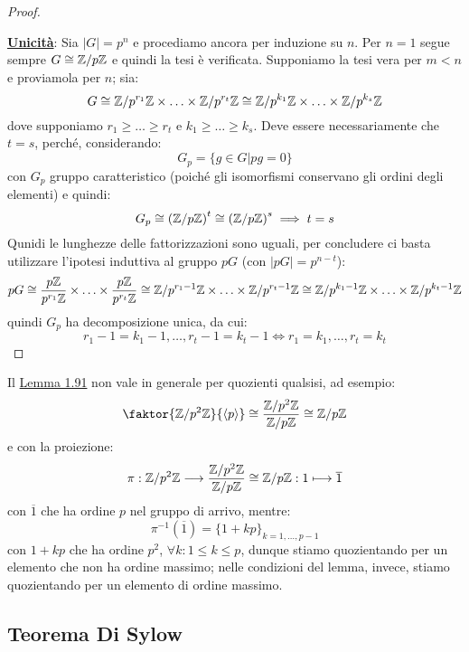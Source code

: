 \documentclass[11pt]{scrartcl}
\begin{document}
\begin{proof}
\begin{itemize}
    \end{itemize}
\underline{\textbf{Unicità}}: Sia $|G| = p^n$ e procediamo ancora per induzione su $n$. Per $n = 1$ segue sempre $G \cong {\mathbb Z}/p{\mathbb Z}$ e quindi la tesi è verificata. Supponiamo la tesi vera per $m<n$ e proviamola per $n$; sia:
        \[ G \cong \mathbb{Z}/{p^{r_1}}\mathbb{Z} \times \ldots \times \mathbb{Z}/{p^{r_t}}\mathbb{Z} \cong \mathbb{Z}/{p^{k_1}}\mathbb{Z} \times \ldots \times \mathbb{Z}/{p^{k_s}}\mathbb{Z}
            \]
        dove supponiamo $r_1 \geq \ldots \geq r_t$ e $k_1 \geq \ldots \geq k_s$. Deve essere necessariamente che $t = s$, perché, considerando:
            \[ G_p = \{g \in G | pg = 0\}
                \]
        con $G_p$ gruppo caratteristico (poiché gli isomorfismi conservano gli ordini degli elementi) e quindi:
            \[ G_p \cong \left({\mathbb Z}/p{\mathbb Z}\right)^t \cong \left({\mathbb Z}/p{\mathbb Z}\right)^s \implies t = s
                \]
        Qunidi le lunghezze delle fattorizzazioni sono uguali, per concludere ci basta utilizzare l'ipotesi induttiva al gruppo $pG$ (con $|pG| = p^{n-t}$):
            \[ pG \cong \frac{p\mathbb Z}{p^{r_1}\mathbb Z} \times \ldots \times \frac{p\mathbb Z}{p^{r_t}\mathbb Z} \cong \mathbb{Z}/{p^{r_1-1}}\mathbb{Z} \times \ldots \times \mathbb{Z}/{p^{r_t-1}}\mathbb{Z} \cong \mathbb{Z}/{p^{k_1-1}}\mathbb{Z} \times \ldots \times \mathbb{Z}/{p^{k_t-1}}\mathbb{Z}
                \]
        quindi $G_p$ ha decomposizione unica, da cui:
            \[ r_1 - 1 = k_1 -1, \ldots, r_t - 1 = k_t - 1 \iff r_1 = k_1, \ldots , r_t = k_t
                \]
\end{proof}

\begin{remark}
    Il \hyperref[l:1.91]{Lemma 1.91} non vale in generale per quozienti qualsisi, ad esempio:
        \[ \faktor{\Z{p^2}}{\left<p\right>} \cong \frac{\Z{p^2}}{\Zp}\cong \Zp
            \]
    e con la proiezione:
        \[ \pi: \mathbb{Z}/{p^2}\mathbb{Z} \longrightarrow \frac{\mathbb{Z}/{p^2}\mathbb{Z}}{{\mathbb Z}/p{\mathbb Z}} \cong {\mathbb Z}/p{\mathbb Z} : 1 \longmapsto \overline 1
            \]
    con $\overline 1$ che ha ordine $p$ nel gruppo di arrivo, mentre:
        \[ \pi^{-1}(\overline 1) = \{1 + kp\}_{k = 1,\ldots,p-1}
            \]
    con $1+kp$ che ha ordine $p^2$, $\forall k : 1 \leq k \leq p$, dunque stiamo quozientando per un elemento che non ha ordine massimo;
     nelle condizioni del lemma, invece, stiamo quozientando per un elemento di ordine massimo.
\end{remark}


\newpage
\subsection{Teorema Di Sylow}
\end{document}
